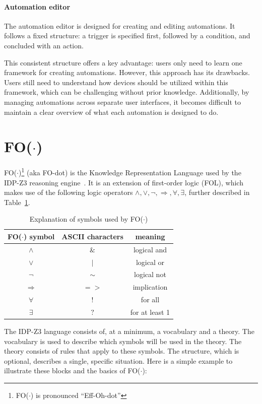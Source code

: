 \documentclass[11pt,a4paper]{report}
\newcommand{\fodot}{FO($\cdot$)\xspace}
\begin{document}
\paragraph{Automation editor}
The automation editor is designed for creating and editing automations. It follows a fixed structure: a trigger is specified first, followed by a condition, and concluded with an action.

This consistent structure offers a key advantage: users only need to learn one framework for creating automations. However, this approach has its drawbacks. Users still need to understand how devices should be utilized within this framework, which can be challenging without prior knowledge. Additionally, by managing automations across separate user interfaces, it becomes difficult to maintain a clear overview of what each automation is designed to do.



\section{\fodot}
\label{fodot}
\fodot \footnote{\fodot is pronounced ``Eff-Oh-dot''} (aka FO-dot) is the Knowledge Representation Language used by the IDP-Z3 reasoning engine~\cite{IDPZ3ReasoningEngine}. It is an extension of first-order logic (FOL), which makes use of the following logic operators $\land, \lor, \neg, \Rightarrow, \forall, \exists$, further described in Table~\ref{tab:fodot_symbols}.

\begin{table}
    \centering
    \caption{Explanation of symbols used by \fodot}
    \label{tab:fodot_symbols}
    \begin{tabular}{|c|c|c|}
    \hline
    \fodot symbol & ASCII characters & meaning \\ \hline
    $\land$  & $\&$ & logical and   \\ \hline
    $\lor$   & $\mid$ & logical or   \\ \hline
    $\neg$   & $\sim$ & logical not   \\ \hline
    $\Rightarrow$ & $=>$ & implication   \\ \hline
    $\forall$ & $!$ & for all   \\ \hline
    $\exists$   & $?$ & for at least 1   \\ \hline
    \end{tabular}
\end{table}


The IDP-Z3 language consists of, at a minimum, a vocabulary and a theory. The vocabulary is used to describe which symbols will be used in the theory. The theory consists of rules that apply to these symbols. The structure, which is optional, describes a single, specific situation. Here is a simple example to illustrate these blocks and the basics of \fodot:
\end{document}
